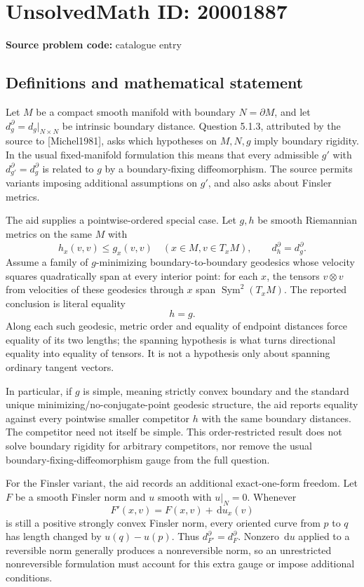 \documentclass[11pt]{article}
\newcommand{\dd}{\,\mathrm{d}}
\begin{document}
\section*{UnsolvedMath ID: 20001887}
\textbf{Source problem code:} catalogue entry
\subsection{Definitions and mathematical statement}
Let \(M\) be a compact smooth manifold with boundary \(N=\partial M\), and let \(d_g^\partial=d_g|_{N\times N}\) be intrinsic boundary distance. Question 5.1.3, attributed by the source to [Michel1981], asks which hypotheses on \(M,N,g\) imply boundary rigidity. In the usual fixed-manifold formulation this means that every admissible \(g'\) with \(d_{g'}^\partial=d_g^\partial\) is related to \(g\) by a boundary-fixing diffeomorphism. The source permits variants imposing additional assumptions on \(g'\), and also asks about Finsler metrics.

The aid supplies a pointwise-ordered special case. Let \(g,h\) be smooth Riemannian metrics on the same \(M\) with
\[
 h_x(v,v)\leq g_x(v,v)\quad(x\in M,v\in T_xM),\qquad
 d_h^\partial=d_g^\partial.
\]
Assume a family of \(g\)-minimizing boundary-to-boundary geodesics whose velocity squares quadratically span at every interior point: for each \(x\), the tensors \(v\otimes v\) from velocities of these geodesics through \(x\) span \(\operatorname{Sym}^2(T_xM)\). The reported conclusion is literal equality
\[
 h=g.
\]
Along each such geodesic, metric order and equality of endpoint distances force equality of its two lengths; the spanning hypothesis is what turns directional equality into equality of tensors. It is not a hypothesis only about spanning ordinary tangent vectors.

In particular, if \(g\) is simple, meaning strictly convex boundary and the standard unique minimizing/no-conjugate-point geodesic structure, the aid reports equality against every pointwise smaller competitor \(h\) with the same boundary distances. The competitor need not itself be simple. This order-restricted result does not solve boundary rigidity for arbitrary competitors, nor remove the usual boundary-fixing-diffeomorphism gauge from the full question.

For the Finsler variant, the aid records an additional exact-one-form freedom. Let \(F\) be a smooth Finsler norm and \(u\) smooth with \(u|_N=0\). Whenever
\[
 F'(x,v)=F(x,v)+\dd u_x(v)
\]
is still a positive strongly convex Finsler norm, every oriented curve from \(p\) to \(q\) has length changed by \(u(q)-u(p)\). Thus \(d_{F'}^\partial=d_F^\partial\). Nonzero \(\dd u\) applied to a reversible norm generally produces a nonreversible norm, so an unrestricted nonreversible formulation must account for this extra gauge or impose additional conditions.
\end{document}
